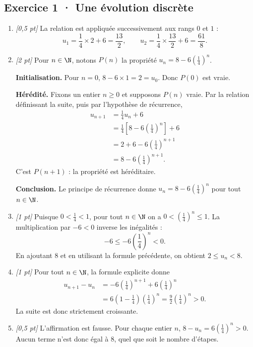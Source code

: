 \subsection*{Exercice 1 · Une évolution discrète}\begin{enumerate}

\item \textit{[0,5 pt]} La relation est appliquée successivement aux rangs $0$ et $1$ :\[u_1=\frac{1}{4}\times 2+6=\frac{13}{2},\qquad u_2=\frac{1}{4}\times \frac{13}{2}+6=\frac{61}{8}.\]

\item \textit{[2 pt]} Pour $n\in\N$, notons $P(n)$ la propriété $u_n=8-6\left(\frac{1}{4}\right)^n$.
\par\smallskip\textbf{Initialisation.} Pour $n=0$, $8-6\times1=2=u_0$. Donc $P(0)$ est vraie.
\par\smallskip\textbf{Hérédité.} Fixons un entier $n\ge0$ et supposons $P(n)$ vraie. Par la relation définissant la suite, puis par l'hypothèse de récurrence,
\[\begin{aligned}u_{n+1}&=\frac{1}{4}u_n+6\\
&=\frac{1}{4}\left[8-6\left(\frac{1}{4}\right)^n\right]+6\\
&=2+6-6\left(\frac{1}{4}\right)^{n+1}\\
&=8-6\left(\frac{1}{4}\right)^{n+1}.
\end{aligned}\]
C'est $P(n+1)$ : la propriété est héréditaire.
\par\smallskip\textbf{Conclusion.} Le principe de récurrence donne $u_n=8-6\left(\frac{1}{4}\right)^n$ pour tout $n\in\N$.

\item \textit{[1 pt]} Puisque $0<\frac{1}{4}<1$, pour tout $n\in\N$ on a $0<(\frac{1}{4})^n\le1$. La multiplication par $-6<0$ inverse les inégalités :
\[-6\le-6(\frac{1}{4})^n<0.\]
En ajoutant $8$ et en utilisant la formule précédente, on obtient $2\le u_n<8$.

\item \textit{[1 pt]} Pour tout $n\in\N$, la formule explicite donne
\[\begin{aligned}u_{n+1}-u_n&=-6(\frac{1}{4})^{n+1}+6(\frac{1}{4})^n\\&=6(1-\frac{1}{4})(\frac{1}{4})^n=\frac{9}{2}(\frac{1}{4})^n>0.\end{aligned}\]
La suite est donc strictement croissante.

\item \textit{[0,5 pt]} L'affirmation est fausse. Pour chaque entier $n$, $8-u_n=6(\frac{1}{4})^n>0$. Aucun terme n'est donc égal à $8$, quel que soit le nombre d'étapes.

\end{enumerate}

